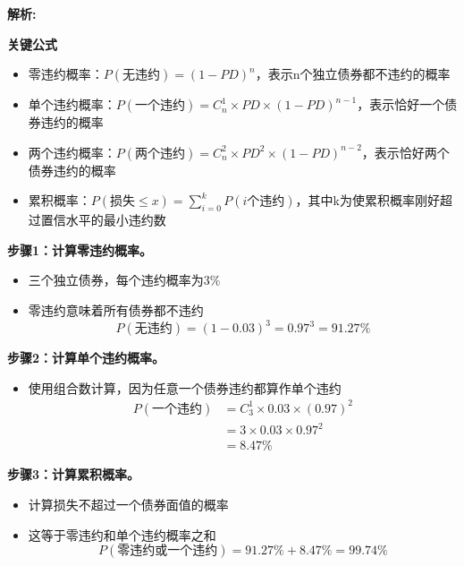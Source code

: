 \documentclass{article}
\newenvironment{explanation}
{\textbf{解析:}\par}
{\par}
\begin{document}
    \begin{explanation}
        \textbf{关键公式}
        \begin{itemize}
            \item 零违约概率：\(P(\text{无违约}) = (1-PD)^n\)，表示n个独立债券都不违约的概率
            \item 单个违约概率：\(P(\text{一个违约}) = C_n^1 \times PD \times (1-PD)^{n-1}\)，表示恰好一个债券违约的概率
            \item 两个违约概率：\(P(\text{两个违约}) = C_n^2 \times PD^2 \times (1-PD)^{n-2}\)，表示恰好两个债券违约的概率
            \item 累积概率：\(P(\text{损失} \leq x) = \sum_{i=0}^k P(i\text{个违约})\)，其中k为使累积概率刚好超过置信水平的最小违约数
        \end{itemize}
    
        \textbf{步骤1：计算零违约概率。}
        \begin{itemize}
            \item 三个独立债券，每个违约概率为3\%
            \item 零违约意味着所有债券都不违约
            \[
            P(\text{无违约}) = (1-0.03)^3 = 0.97^3 = 91.27\%
            \]
        \end{itemize}
        
        \textbf{步骤2：计算单个违约概率。}
        \begin{itemize}
            \item 使用组合数计算，因为任意一个债券违约都算作单个违约
            \[
            \begin{aligned}
            P(\text{一个违约}) &= C_3^1 \times 0.03 \times (0.97)^2 \\
            &= 3 \times 0.03 \times 0.97^2 \\
            &= 8.47\%
            \end{aligned}
            \]
        \end{itemize}
        
        \textbf{步骤3：计算累积概率。}
        \begin{itemize}
            \item 计算损失不超过一个债券面值的概率
            \item 这等于零违约和单个违约概率之和
            \[
            P(\text{零违约或一个违约}) = 91.27\% + 8.47\% = 99.74\%
            \]
        \end{itemize}
        

\end{explanation}
\end{document}
